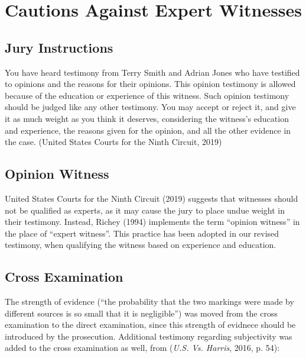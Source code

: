 \documentclass[print]{nuthesis}
\begin{document}
\hypertarget{cautions-against-expert-witnesses}{%
\section{Cautions Against Expert Witnesses}\label{cautions-against-expert-witnesses}}

\hypertarget{jury-instructions}{%
\subsection{Jury Instructions}\label{jury-instructions}}

You have heard testimony from Terry Smith and Adrian Jones who have testified to opinions and the reasons for their opinions. This opinion testimony is allowed because of the education or experience of this witness.
Such opinion testimony should be judged like any other testimony.
You may accept or reject it, and give it as much weight as you think it deserves, considering the witness's education and experience, the reasons given for the opinion, and all the other evidence in the case. (United States Courts for the Ninth Circuit, 2019)

\hypertarget{opinion-witness}{%
\subsection{Opinion Witness}\label{opinion-witness}}

United States Courts for the Ninth Circuit (2019) suggests that witnesses should not be qualified as experts, as it may cause the jury to place undue weight in their testimony. Instead, Richey (1994) implements the term ``opinion witness'' in the place of ``expert witness''. This practice has been adopted in our revised testimony, when qualifying the witness based on experience and education.

\hypertarget{cross-examination}{%
\subsection{Cross Examination}\label{cross-examination}}

The strength of evidence (``the probability that the two markings were made by different sources is so small that it is negligible'') was moved from the cross examination to the direct examination, since this strength of evidnece should be introduced by the prosecution. Additional testimony regarding subjectivity was added to the cross examination as well, from (\emph{{U.S.} Vs. {Harris}}, 2016, p. 54):
\end{document}
